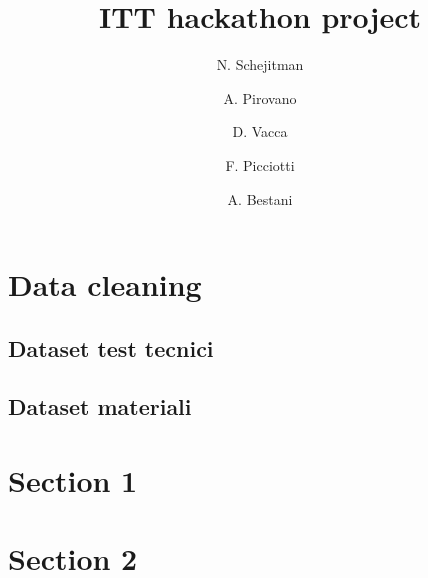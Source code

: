 \documentclass[british]{beamer}
\begin{document}
%
\title[IBM hackathon]
{ITT hackathon project}

\subtitle{}

\author[N. Schejitman, A. Pirovano, D. Vacca, F. Picciotti, A. Bestani]
{N. Schejitman \and A. Pirovano \and D. Vacca \and F. Picciotti \and A. Bestani}





\maketitle

\section{Data cleaning}
	
\subsection{Dataset test tecnici}

\subsection{Dataset materiali}

\section{Section 1}

\section{Section 2}
\end{document}
